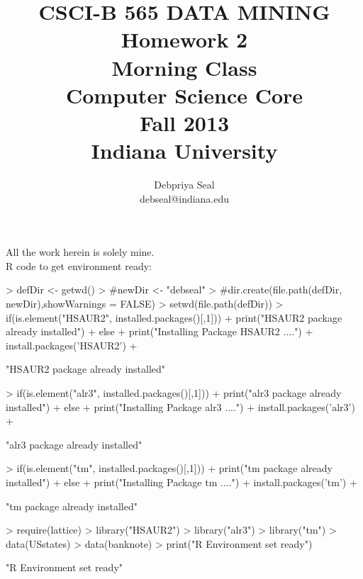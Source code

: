 \documentclass{article}
\begin{document}
\title{ CSCI-B 565 DATA MINING \\
Homework 2 \\
Morning Class\\
Computer Science Core\\Fall 2013\\Indiana University}
\author{ Debpriya Seal\\ debseal@indiana.edu}
\maketitle
All the work herein is solely mine. \\

R code to get environment ready: \\
\begin{Schunk}
\begin{Sinput}
> defDir <- getwd()
> #newDir <- "debseal"
> #dir.create(file.path(defDir, newDir),showWarnings = FALSE)
> setwd(file.path(defDir))
> if(is.element("HSAUR2", installed.packages()[,1])) { 
+ 	print("HSAUR2 package already installed") 
+ } else {
+ 	print("Installing Package HSAUR2 ....") 
+ 	install.packages('HSAUR2')
+ }
\end{Sinput}
\begin{Soutput}
[1] "HSAUR2 package already installed"
\end{Soutput}
\begin{Sinput}
> if(is.element("alr3", installed.packages()[,1])) { 
+ 	print("alr3 package already installed") 
+ } else {
+ 	print("Installing Package alr3 ....") 
+ 	install.packages('alr3')
+ }
\end{Sinput}
\begin{Soutput}
[1] "alr3 package already installed"
\end{Soutput}
\begin{Sinput}
> if(is.element("tm", installed.packages()[,1])) { 
+ 	print("tm package already installed") 
+ } else {
+ 	print("Installing Package tm ....") 
+ 	install.packages('tm')
+ }
\end{Sinput}
\begin{Soutput}
[1] "tm package already installed"
\end{Soutput}
\begin{Sinput}
> require(lattice)
> library("HSAUR2")
> library("alr3")
> library("tm")
> data(USstates)
> data(banknote)
> print("R Environment set ready") 
\end{Sinput}
\begin{Soutput}
[1] "R Environment set ready"
\end{Soutput}
\end{Schunk}
\end{document}
